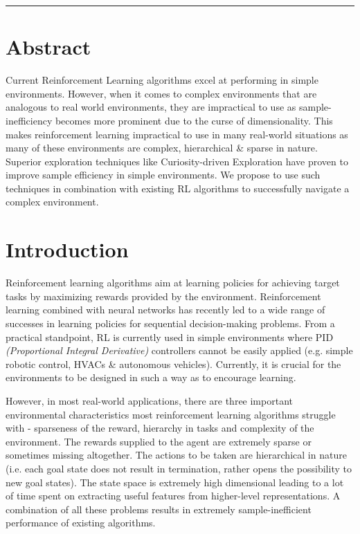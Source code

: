 \documentclass[12pt,a4paper]{article}
\begin{document}
\reviewtitle
\hrule

\section{Abstract}
Current Reinforcement Learning algorithms excel at performing in
simple environments. However, when it comes to complex environments 
that are analogous to real world environments, they are impractical to use 
as sample-inefficiency becomes more prominent due to the curse of
dimensionality. This makes reinforcement learning impractical to 
use in many real-world situations as many  of these environments are 
complex, hierarchical \& sparse in  nature. Superior exploration techniques 
like Curiosity-driven Exploration have proven to improve sample efficiency 
in simple environments. We propose to use such techniques in combination 
with existing RL algorithms to successfully navigate a complex 
environment.

\section{Introduction}
Reinforcement learning algorithms aim at learning policies for achieving 
target tasks by maximizing rewards provided by the environment. Reinforcement
learning combined with neural networks has recently led to a wide range of 
successes in learning policies for sequential decision-making problems. From a
practical standpoint, RL is currently used in simple environments where PID 
\textit{(Proportional Integral Derivative)} controllers cannot be easily applied
(e.g. simple robotic control, HVACs \& autonomous vehicles). Currently, 
it is crucial for the environments to be designed in such a way as to encourage 
learning.

However, in most real-world applications, there are three important environmental
characteristics most reinforcement learning algorithms struggle with - sparseness of the reward, 
hierarchy in tasks and complexity of the environment. The 
rewards supplied to the agent are extremely sparse or sometimes missing 
altogether. The actions  to be taken are hierarchical in nature (i.e. 
each goal state does not result in termination, rather opens the possibility 
to new goal states). The state space is extremely high dimensional leading 
to a lot of time spent on extracting useful features from higher-level 
representations. A combination of all these problems results in extremely 
sample-inefficient performance of existing algorithms.
\end{document}
